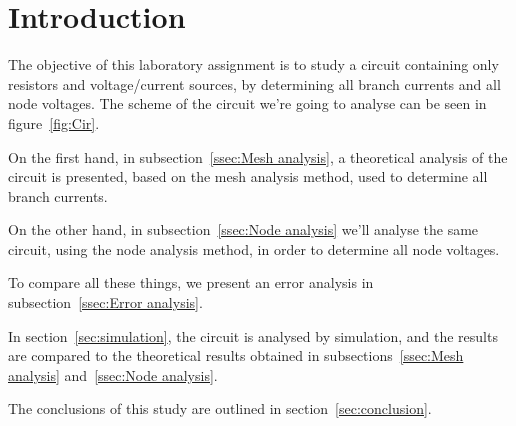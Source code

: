 \section{Introduction}
\label{sec:introduction}

\par The objective of this laboratory assignment is to study a circuit containing only resistors and voltage/current sources, by determining all branch currents and all node voltages.
The scheme of the circuit we're going to analyse can be seen in figure~\ref{fig:Cir}.
\par \noindent On the first hand, in subsection~\ref{ssec:Mesh analysis}, a theoretical analysis of the circuit is
presented, based on the mesh analysis method, used to determine all branch currents. 
\par \noindent On the other hand, in subsection~\ref{ssec:Node analysis} we'll analyse the same circuit, using the node analysis method, in order to determine all node voltages.
\par \noindent To compare all these things, we present an error analysis in subsection~\ref{ssec:Error analysis}.
\par \noindent In section~\ref{sec:simulation}, the circuit is analysed by simulation, and the results are compared to the theoretical results obtained in
subsections~\ref{ssec:Mesh analysis} and~\ref{ssec:Node analysis}. 
\par \noindent The conclusions of this study are outlined in section~\ref{sec:conclusion}.


